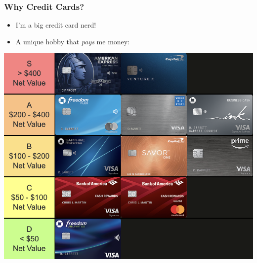 \begin{frame}
    \frametitle{Why Credit Cards?}
    \begin{itemize}
        \item I'm a big credit card nerd! 
        \item A unique hobby that \emph{pays} me money:
    \end{itemize}
    \begin{center}
        \includegraphics[width=.75\textwidth]{../Misc/Tiermaker_May2024_NetValue.png}
    \end{center}
\end{frame}
    
